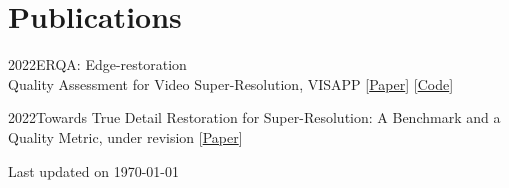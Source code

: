 \documentclass{tccv}
\newcommand{\updateinfo}[1][\today]{\par\vfill\hfill{\scriptsize\color{darkergray}Last updated on #1}}
\begin{document}


\section{Publications}

\begin{factlist}
     \item{2022}{ERQA: Edge-restoration \\ Quality Assessment for Video Super-Resolution, VISAPP [\href{https://arxiv.org/abs/2110.09992}{Paper}] [\href{https://github.com/msu-video-group/ERQA}{Code}]}
     \item{2022}{Towards True Detail Restoration for Super-Resolution: A Benchmark and a Quality Metric, under revision [\href{https://arxiv.org/abs/2203.08923}{Paper}]}
\end{factlist}

\updateinfo
\end{document}
